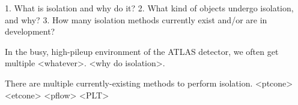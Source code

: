 1. What is isolation and why do it?
2. What kind of objects undergo isolation, and why?
3. How many isolation methods currently exist and/or are in development?

In the busy, high-pileup environment of the ATLAS detector, we often get multiple <whatever>. <why do isolation>.

There are multiple currently-existing methods to perform isolation. <ptcone> <etcone> <pflow> <PLT>